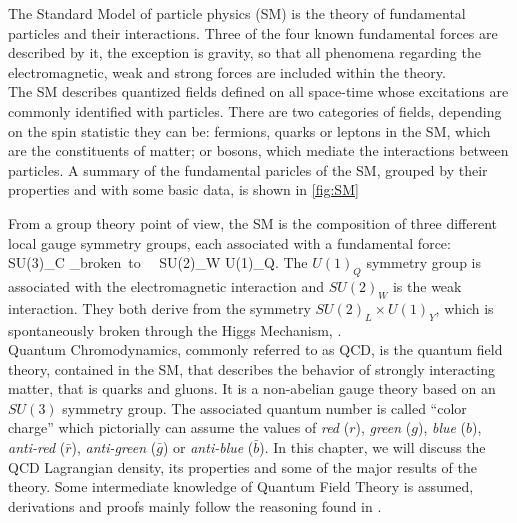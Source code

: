 The Standard Model of particle physics (SM) is the theory of fundamental particles and their interactions. Three of the four known fundamental forces are described by it, the exception is gravity, so that all phenomena regarding the electromagnetic, weak and strong forces are included within the theory. \\
The SM describes quantized fields defined on all space-time whose excitations are commonly identified with particles. There are two categories of fields, depending on the spin statistic they can be: fermions, quarks or leptons in the SM, which are the constituents of matter; or bosons, which mediate the interactions between particles. A summary of the fundamental paricles of the SM, grouped by their properties and with some basic data, is shown in \cref{fig:SM}\\
\begin{center}
  
\end{center}
From a group theory point of view, the SM is the composition of three different local gauge symmetry groups, each associated with a fundamental force:
\beq
    SU(3)_C \times {}_{broken~to~~ SU(2)_W \times U(1)_{Q}}.
\eeq
The $U(1)_{Q}$ symmetry group is associated with the electromagnetic interaction and $SU(2)_{W}$ is the weak interaction. They both derive from the symmetry $SU(2)_L \times U(1)_{Y}$, which is spontaneously broken through the Higgs Mechanism, . \\ 
Quantum Chromodynamics, commonly referred to as QCD, is the quantum field theory, contained in the SM, that describes the behavior of strongly interacting matter, that is quarks and gluons. It is a non-abelian gauge theory based on an $SU(3)$ symmetry group. The associated quantum number is called ``color charge'' which pictorially can assume the values of \textit{red} ($r$), \textit{green} ($g$), \textit{blue} ($b$), \textit{anti-red} ($\bar r$), \textit{anti-green} ($\bar g$) or \textit{anti-blue} ($\bar b$). In this chapter, we will discuss the QCD Lagrangian density, its properties and some of the major results of the theory. Some intermediate knowledge of Quantum Field Theory is assumed, derivations and proofs mainly follow the reasoning found in \cite{peskin}.  

